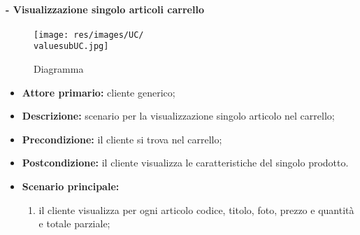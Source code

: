 \paragraph{ - Visualizzazione singolo articoli carrello}
\begin{figure}[H]
    \centering
    \texttt{[image: res/images/UC/\\valuesubUC.jpg]}
    \caption{Diagramma }
\end{figure}
\begin{itemize}
    \item \textbf{Attore primario:} cliente generico;
    \item \textbf{Descrizione:} scenario per la visualizzazione singolo articolo nel carrello;
    \item \textbf{Precondizione:} il cliente si trova nel carrello;
    \item \textbf{Postcondizione:} il cliente visualizza le caratteristiche del singolo prodotto.
    \item \textbf{Scenario principale:}
          \begin{enumerate}
              \item il cliente visualizza per ogni articolo codice, titolo, foto, prezzo e quantità e totale parziale;
          \end{enumerate}
\end{itemize}


\stepsubUserCase
